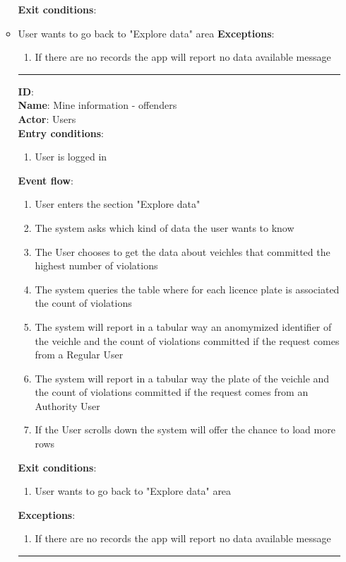 \begin{enumerate}
\begin{itemize}
		\textbf{Exit conditions}:
          \item{User wants to go back to "Explore data" area}
		\textbf{Exceptions}:
    \begin{enumerate}
      \item{If there are no records the app will report no data available message}
    \end{enumerate}
		\rule{\linewidth}{0.4pt}
		\textbf{ID}:  \\
		\textbf{Name}: Mine information - offenders \\
		\textbf{Actor}: Users   \\
		\textbf{Entry conditions}:
		\begin{enumerate}
			\item{User is logged in}
		\end{enumerate}
		\textbf{Event flow}:
		\begin{enumerate}
			\item{User enters the section "Explore data"}
			\item{The system asks which kind of data the user wants to know}
      \item{The User chooses to get the data about veichles that committed the highest number of violations}
      \item{The system queries the table where for each licence plate is associated the count of violations }
      \item{The system will report in a tabular way an anomymized identifier of the veichle and the count of violations committed if the request comes from a Regular User}
      \item{The system will report in a tabular way the plate of the veichle and the count of violations committed if the request comes from an Authority User}
      \item{If the User scrolls down the system will offer the chance to load more rows}
		\end{enumerate}
		\textbf{Exit conditions}:
    \begin{enumerate}
      \item{User wants to go back to "Explore data" area}
    \end{enumerate}
		\textbf{Exceptions}:
		\begin{enumerate}
			\item{If there are no records the app will report no data available message}
		\end{enumerate}
		\rule{\linewidth}{0.4pt}


\end{itemize}
\end{enumerate}
